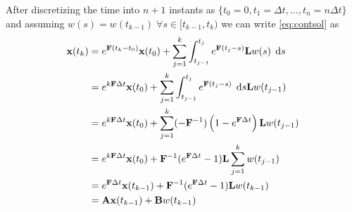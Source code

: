 \documentclass[a4paper,oneside,article]{memoir}
\begin{document}
\subsubsection{}

After discretizing the time into $n+1$ instants as $\{t_0=0,t_1=\Delta t,\dots,t_n=n\Delta t\}$ and assuming $w(s)=w(t_{k-1})\; \forall s\in[t_{k-1},t_k)$
we can write \eqref{eq:contsol} as
\begin{align}
	\v{x}(t_k)&=e^{\v{F}(t_k-t_0)}\v{x}(t_0)+\sum_{j=1}^k \defint{t_{j-1}}{t_j}{e^{\v{F}(t_j-s)}\v{L}w(s)}{s}\\
	&=e^{k\v{F}\Delta t}\v{x}(t_0)+\sum_{j=1}^k \defint{t_{j-1}}{t_j}{e^{\v{F}(t_j-s)}}{s}\v{L}w(t_{j-1})\\
	&=e^{k\v{F}\Delta t}\v{x}(t_0)+\sum_{j=1}^k (-\v{F}^{-1})\left(1-e^{\v{F}\Delta t}\right)\v{L}w(t_{j-1})\\
	&=e^{k\v{F}\Delta t}\v{x}(t_0)+\v{F}^{-1}(e^{\v{F}\Delta t}-1)\v{L}\sum_{j=1}^k w(t_{j-1})\\
	&=e^{\v{F}\Delta t}\v{x}(t_{k-1})+\v{F}^{-1}(e^{\v{F}\Delta t}-1)\v{L} w(t_{k-1})\\
	&=\v{A}\v{x}(t_{k-1})+\v{B}w(t_{k-1})
\end{align}
\end{document}
